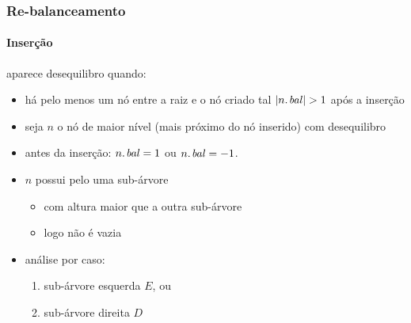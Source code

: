 \documentclass{beamer}
\begin{document}
\begin{frame}

\frametitle{Re-balanceamento}
\framesubtitle{Inserção}

aparece desequilibro quando:

\begin{itemize}

\item há pelo menos um nó entre a raiz e o nó criado tal $\left|\attrib{n}{bal}\right| > 1$ após a inserção

\item seja $n$ o nó de maior nível (mais próximo do nó inserido) com
desequilibro

\item antes da inserção: $\attrib{n}{bal} = 1$ ou $\attrib{n}{bal} = -1$.

\item $n$ possui pelo uma sub-árvore 

  \begin{itemize}

    \item com altura maior que a outra sub-árvore

    \item logo não é vazia

  \end{itemize}

\item análise por caso: 

  \begin{enumerate}

  \item sub-árvore esquerda $E$, ou

  \item sub-árvore direita $D$

  \end{enumerate}

\end{itemize}

\end{frame}
\end{document}
